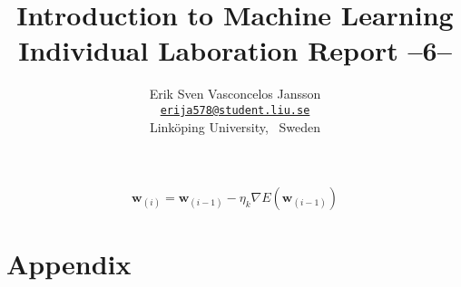 \documentclass[a4paper, twocolumn]{article}
\title{Introduction to Machine Learning \\
       Individual Laboration Report --6--}
\author{{Erik Sven Vasconcelos Jansson} \\
        {\href{mailto:erija578@student.liu.se}
        {\texttt{erija578@student.liu.se}}} \\
        {Linköping University, \, Sweden}}
\begin{document}
    \maketitle %

    \begin{equation} \label{eq:batch_gradient}
        \bm{w}_{(i)} = \bm{w}_{(i-1)} - \eta_k \nabla E(\bm{w}_{(i-1)})
    \end{equation}

    \nocite{*}
    
    

    \onecolumn \appendix
    \section*{Appendix}
\end{document}
